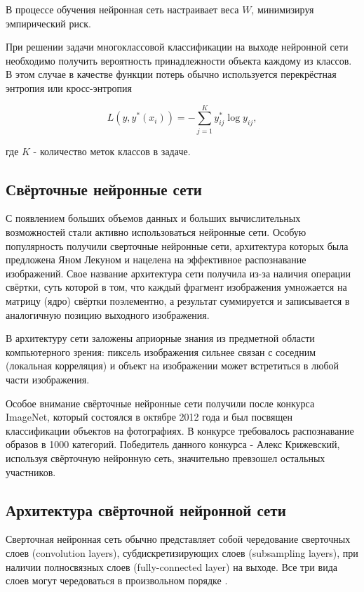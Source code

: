 В процессе обучения нейронная сеть настраивает веса $W$, минимизируя эмпирический риск.

При решении задачи многоклассовой классификации на выходе нейронной сети необходимо получить вероятность принадлежности объекта каждому из классов. В этом случае в качестве функции потерь обычно используется перекрёстная энтропия или кросс-энтропия

\begin{equation}
L(y, y^*(x_i)) = -\sum^K_{j=1}y^*_{ij} \log y_{ij} ,
\end{equation}

\noindent где $K$ - количество меток классов в задаче.
 
\subsection{Свёрточные нейронные сети} \label{convnets}
С появлением больших объемов данных и больших вычислительных возможностей стали активно использоваться нейронные сети. Особую популярность получили сверточные нейронные сети, архитектура которых была предложена Яном Лекуном \cite{LeCun1998GradientbasedLA} и нацелена на эффективное распознавание изображений. Свое название архитектура сети получила из-за наличия операции свёртки, суть которой в том, что каждый фрагмент изображения умножается на матрицу (ядро) свёртки поэлементно, а результат суммируется и записывается в аналогичную позицию выходного изображения. 

В архитектуру сети заложены априорные знания из предметной области компьютерного зрения: пиксель изображения сильнее связан с соседним (локальная корреляция) и объект на изображении может встретиться в любой части изображения.

Особое внимание свёрточные нейронные сети получили после конкурса ImageNet\cite{imagenet}, который состоялся в октябре 2012 года и был посвящен классификации объектов на фотографиях. В конкурсе требовалось распознавание образов в 1000 категорий. Победитель данного конкурса - Алекс Крижевский, используя свёрточную нейронную сеть, значительно превзошел остальных участников\cite{alexnet}.

\subsection{Архитектура свёрточной нейронной сети} \label{cnnarch}
Сверточная нейронная сеть обычно представляет собой чередование сверточных слоев (convolution layers), субдискретизирующих слоев (subsampling layers), при наличии полносвязных слоев (fully-connected layer) на выходе. Все три вида слоев могут чередоваться в произвольном порядке \cite{LeCun1998GradientbasedLA}.

